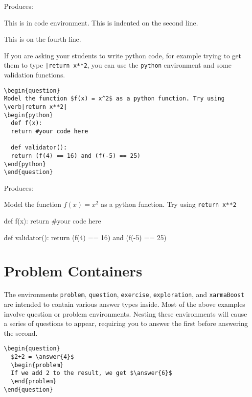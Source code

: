 \documentclass{ximera}
\begin{document}
Produces:

\begin{code}
This is in code environment.
    This is indented on the second line.

This is on the fourth line.
\end{code}

If you are asking your students to write python code, for example trying to get them to type \verb!|return x**2!, you can use the \verb!python! environment and some validation functions.

\begin{verbatim}
\begin{question}
Model the function $f(x) = x^2$ as a python function. Try using \verb|return x**2|
\begin{python}
  def f(x):
  return #your code here

  def validator():
  return (f(4) == 16) and (f(-5) == 25)
\end{python}
\end{question}
\end{verbatim}

Produces:

\begin{question}
Model the function $f(x) = x^2$ as a python function. Try using \verb|return x**2|
\begin{python}
  def f(x):
  return #your code here

  def validator():
  return (f(4) == 16) and (f(-5) == 25)
\end{python}
\end{question}



\section{Problem Containers} \label{ProblemContainers}

The environments \verb!problem!, \verb!question!, \verb!exercise!, \verb!exploration!, and \verb!xarmaBoost! are intended to contain various answer types inside. Most of the above examples involve question or problem environments. Nesting these environments will cause a series of questions to appear, requiring you to answer the first before answering the second.

\begin{verbatim}
\begin{question}
  $2+2 = \answer{4}$
  \begin{problem}
  If we add 2 to the result, we get $\answer{6}$
  \end{problem}
\end{question}
\end{verbatim}
\end{document}
